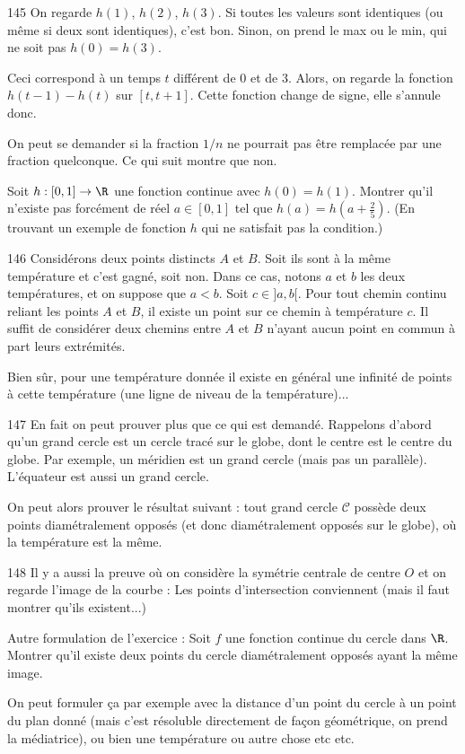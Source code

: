 \begin{Soln}{145}
On regarde $h(1)$, $h(2)$, $h(3)$. Si toutes les valeurs sont identiques (ou même si deux sont identiques), c'est bon. Sinon, on prend le max ou le min, qui ne soit pas $h(0)=h(3)$.

Ceci correspond à un temps $t$ différent de $0$ et de $3$. Alors, on regarde la fonction $h(t-1)-h(t)$ sur $[t,t+1]$. Cette fonction change de signe, elle s'annule donc.

\begin{remarque}
On peut se demander si la fraction $1/n$ ne pourrait pas être remplacée par une fraction quelconque. Ce qui suit montre que non.

Soit $h : [0,1] \to \R$ une fonction continue avec $h(0)=h(1)$. Montrer qu'il n'existe pas forcément de réel $a\in [0,1]$ tel que $h(a)=h(a+\frac25)$. (En trouvant un exemple de fonction $h$ qui ne satisfait pas la condition.)
\end{remarque}
\end{Soln}
\begin{Soln}{146}
Considérons deux points distincts $A$ et $B$. Soit ils sont à la même température et c'est gagné, soit non. Dans ce cas, notons $a$ et $b$ les deux températures, et on suppose que $a<b$. Soit $c\in ]a,b[$. Pour tout chemin continu reliant les points $A$ et $B$, il existe un point sur ce chemin à température $c$. Il suffit de considérer deux chemins entre $A$ et $B$ n'ayant aucun point en commun à part leurs extrémités.

Bien sûr, pour une température donnée il existe en général une infinité de points à cette température (une ligne de niveau de la température)...
\end{Soln}
\begin{Soln}{147}
En fait on peut prouver plus que ce qui est demandé. Rappelons d'abord qu'un grand cercle est un cercle tracé sur le globe, dont le centre est le centre du globe. Par exemple, un méridien est un grand cercle (mais pas un parallèle). L'équateur est aussi un grand cercle.

On peut alors prouver le résultat suivant : tout grand cercle $\mathcal C$ possède deux points diamétralement opposés (et donc diamétralement opposés sur le globe), où la température est la même.

\end{Soln}
\begin{Soln}{148}
Il y a aussi la preuve où on considère la symétrie centrale de centre $O$ et on regarde l'image de la courbe : Les points d'intersection conviennent (mais il faut montrer qu'ils existent...)

Autre formulation de l'exercice  : Soit $f$ une fonction continue du cercle dans $\R$. Montrer qu'il existe deux points du cercle diamétralement opposés ayant la même image.

On peut formuler ça par exemple avec la distance d'un point du cercle à un point du plan donné (mais c'est résoluble directement de façon géométrique, on prend la médiatrice), ou bien une température ou autre chose etc etc.
\end{Soln}
